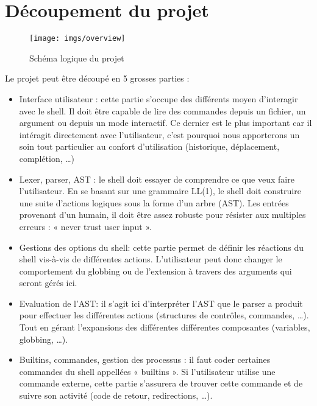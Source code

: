 \section{Découpement du projet}
\begin{sidewaysfigure}[ftbp]
    \texttt{[image: imgs/overview]}
    \caption{Schéma logique du projet}
\end{sidewaysfigure}

Le projet peut être découpé en 5 grosses parties :
\begin{itemize}
    \item Interface utilisateur : cette partie s'occupe des différents moyen
        d'interagir avec le shell. Il doit être capable de lire des commandes
        depuis un fichier, un argument ou depuis un mode interactif.
        Ce dernier est le plus important car il intéragit directement avec
        l'utilisateur, c'est pourquoi nous apporterons un soin tout particulier
        au confort d'utilisation (historique, déplacement, complétion, \ldots)
    \item Lexer, parser, AST : le shell doit essayer de comprendre ce que veux
        faire l'utilisateur. En se basant sur une grammaire LL(1), le shell
        doit construire une suite d'actions logiques sous la forme d'un arbre
        (AST). Les entrées provenant d'un humain, il doit être assez robuste
        pour résister aux multiples erreurs : « never trust user input ».
    \item Gestions des options du shell: cette partie permet de définir les
        réactions du shell vis-à-vis de différentes actions. L'utilisateur peut
        donc changer le comportement du globbing ou de l'extension à travers
        des arguments qui seront gérés ici.
    \item Evaluation de l'AST: il s'agit ici d'interpréter l'AST que le parser
        a produit pour effectuer les différentes actions (structures de
        contrôles, commandes, \ldots). Tout en gérant l'expansions des
        différentes différentes composantes (variables, globbing, \ldots).
    \item Builtins, commandes, gestion des processus : il faut coder certaines
        commandes du shell appellées « builtins ». Si l'utilisateur utilise
        une commande externe, cette partie s'assurera de trouver cette commande
        et de suivre son activité (code de retour, redirections, \ldots).
\end{itemize}
